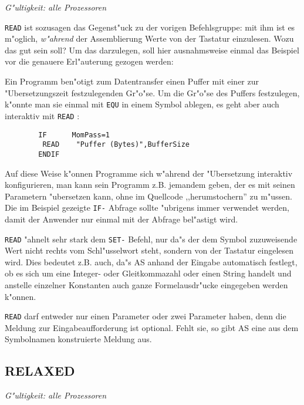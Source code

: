 \documentclass[12pt,a4paper,twoside]{report}
\makeatletter
\newcommand{\ii}[1]{{\it #1}}
\newcommand{\tty}[1]{{\tt #1}}
\newcommand{\ttindex}[1]{\index{#1@{\tt #1}}}
\makeatother
\begin{document}
{\em G"ultigkeit: alle Prozessoren}

\tty{READ} ist sozusagen das Gegenst"uck zu der vorigen Befehlsgruppe: mit
ihm ist es m"oglich, \ii{w"ahrend} der Assemblierung Werte von der
Tastatur einzulesen.  Wozu das gut sein soll?  Um das darzulegen, soll
hier ausnahmsweise einmal das Beispiel vor die genauere Erl"auterung
gezogen werden:
\par
Ein Programm ben"otigt zum Datentransfer einen Puffer mit einer zur
"Ubersetzungszeit festzulegenden Gr"o"se.  Um die Gr"o"se des Puffers
festzulegen, k"onnte man sie einmal mit \tty{EQU} in einem Symbol
ablegen, es geht aber auch interaktiv mit \tty{READ} :
\begin{verbatim}
        IF      MomPass=1
         READ    "Puffer (Bytes)",BufferSize
        ENDIF
\end{verbatim}
Auf diese Weise k"onnen Programme sich w"ahrend der "Ubersetzung
interaktiv konfigurieren, man kann sein Programm z.B. jemandem geben,
der es mit seinen Parametern "ubersetzen kann, ohne im Quellcode
,,herumstochern'' zu m"ussen.  Die im Beispiel gezeigte \tty{IF-}
Abfrage sollte "ubrigens immer verwendet werden, damit der Anwender
nur einmal mit der Abfrage bel"astigt wird.
\par
\tty{READ} "ahnelt sehr stark dem \tty{SET-} Befehl, nur da"s der
dem Symbol zuzuweisende Wert nicht rechts vom Schl"usselwort steht,
sondern von der Tastatur eingelesen wird.  Dies bedeutet z.B. auch,
da"s AS anhand der Eingabe automatisch festlegt, ob es sich um eine
Integer- oder Gleitkommazahl oder einen String handelt und anstelle
einzelner Konstanten auch ganze Formelausdr"ucke eingegeben werden
k"onnen.
\par
\tty{READ} darf entweder nur einen Parameter oder zwei Parameter
haben, denn die Meldung zur Eingabeaufforderung ist optional.  Fehlt
sie, so gibt AS eine aus dem Symbolnamen konstruierte Meldung aus.


\subsection{RELAXED}
\label{SectRELAXED}
\ttindex{RELAXED}

{\em G"ultigkeit: alle Prozessoren}
\end{document}
